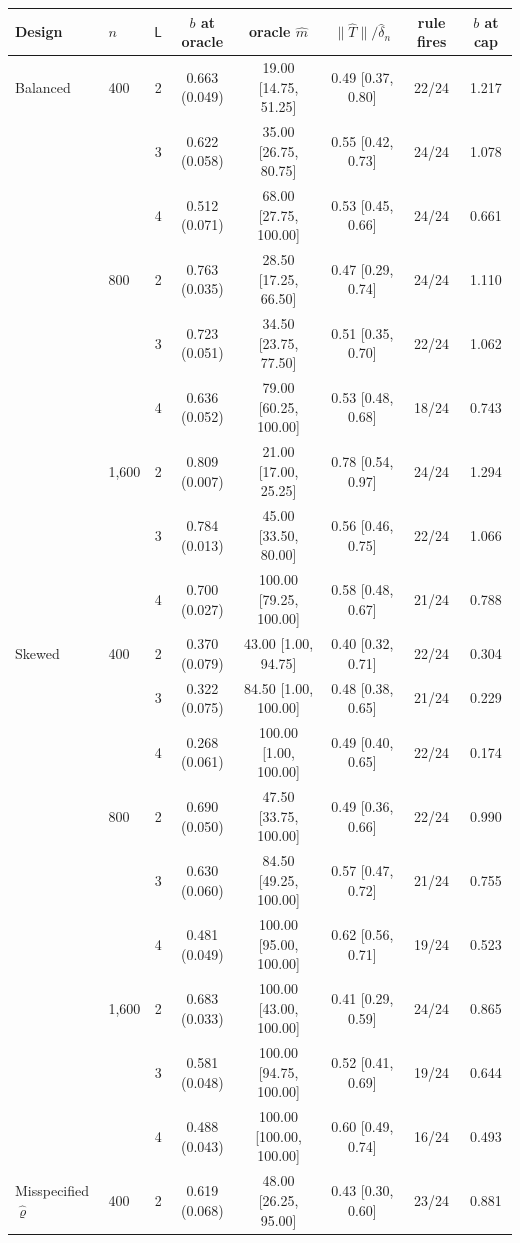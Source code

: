 \begin{tabular}{llcccccc}
\toprule
Design & $n$ & $\mathsf L$ & $b$ at oracle & oracle $\hat m$ & $\|\hat T\|/\hat\delta_n$ & rule fires & $b$ at cap \\
\midrule
Balanced & 400 & 2 & 0.663 (0.049) & 19.00 [14.75, 51.25] & 0.49 [0.37, 0.80] & 22/24 & 1.217 \\
 &  & 3 & 0.622 (0.058) & 35.00 [26.75, 80.75] & 0.55 [0.42, 0.73] & 24/24 & 1.078 \\
 &  & 4 & 0.512 (0.071) & 68.00 [27.75, 100.00] & 0.53 [0.45, 0.66] & 24/24 & 0.661 \\
 & 800 & 2 & 0.763 (0.035) & 28.50 [17.25, 66.50] & 0.47 [0.29, 0.74] & 24/24 & 1.110 \\
 &  & 3 & 0.723 (0.051) & 34.50 [23.75, 77.50] & 0.51 [0.35, 0.70] & 22/24 & 1.062 \\
 &  & 4 & 0.636 (0.052) & 79.00 [60.25, 100.00] & 0.53 [0.48, 0.68] & 18/24 & 0.743 \\
 & 1,600 & 2 & 0.809 (0.007) & 21.00 [17.00, 25.25] & 0.78 [0.54, 0.97] & 24/24 & 1.294 \\
 &  & 3 & 0.784 (0.013) & 45.00 [33.50, 80.00] & 0.56 [0.46, 0.75] & 22/24 & 1.066 \\
 &  & 4 & 0.700 (0.027) & 100.00 [79.25, 100.00] & 0.58 [0.48, 0.67] & 21/24 & 0.788 \\
\addlinespace
Skewed & 400 & 2 & 0.370 (0.079) & 43.00 [1.00, 94.75] & 0.40 [0.32, 0.71] & 22/24 & 0.304 \\
 &  & 3 & 0.322 (0.075) & 84.50 [1.00, 100.00] & 0.48 [0.38, 0.65] & 21/24 & 0.229 \\
 &  & 4 & 0.268 (0.061) & 100.00 [1.00, 100.00] & 0.49 [0.40, 0.65] & 22/24 & 0.174 \\
 & 800 & 2 & 0.690 (0.050) & 47.50 [33.75, 100.00] & 0.49 [0.36, 0.66] & 22/24 & 0.990 \\
 &  & 3 & 0.630 (0.060) & 84.50 [49.25, 100.00] & 0.57 [0.47, 0.72] & 21/24 & 0.755 \\
 &  & 4 & 0.481 (0.049) & 100.00 [95.00, 100.00] & 0.62 [0.56, 0.71] & 19/24 & 0.523 \\
 & 1,600 & 2 & 0.683 (0.033) & 100.00 [43.00, 100.00] & 0.41 [0.29, 0.59] & 24/24 & 0.865 \\
 &  & 3 & 0.581 (0.048) & 100.00 [94.75, 100.00] & 0.52 [0.41, 0.69] & 19/24 & 0.644 \\
 &  & 4 & 0.488 (0.043) & 100.00 [100.00, 100.00] & 0.60 [0.49, 0.74] & 16/24 & 0.493 \\
\addlinespace
Misspecified $\hat\varrho$ & 400 & 2 & 0.619 (0.068) & 48.00 [26.25, 95.00] & 0.43 [0.30, 0.60] & 23/24 & 0.881 \\

\end{tabular}
